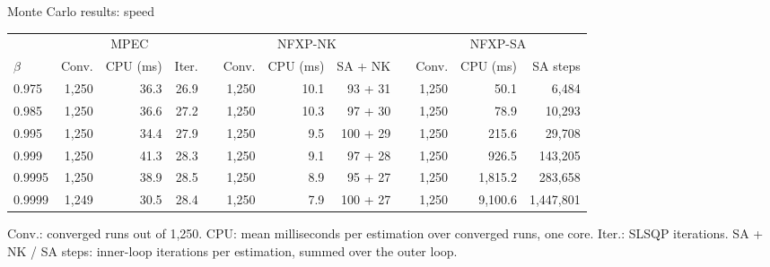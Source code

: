 \documentclass[aspectratio=169,11pt]{beamer}
\begin{document}
\begin{frame}{Monte Carlo results: speed}
\scriptsize
\begin{center}
\begin{tabular}{l rrr c rrr c rrr}
\toprule
 & \multicolumn{3}{c}{MPEC} & & \multicolumn{3}{c}{NFXP-NK} & & \multicolumn{3}{c}{NFXP-SA}\\
\cmidrule{2-4} \cmidrule{6-8} \cmidrule{10-12}
$\beta$ & Conv. & CPU (ms) & Iter. & & Conv. & CPU (ms) & SA + NK & & Conv. & CPU (ms) & SA steps\\
\midrule
0.975  & 1{,}250 & 36.3 & 26.9 & & 1{,}250 & 10.1 & 93 + 31  & & 1{,}250 & 50.1    & 6{,}484\\
0.985  & 1{,}250 & 36.6 & 27.2 & & 1{,}250 & 10.3 & 97 + 30  & & 1{,}250 & 78.9    & 10{,}293\\
0.995  & 1{,}250 & 34.4 & 27.9 & & 1{,}250 &  9.5 & 100 + 29 & & 1{,}250 & 215.6   & 29{,}708\\
0.999  & 1{,}250 & 41.3 & 28.3 & & 1{,}250 &  9.1 & 97 + 28  & & 1{,}250 & 926.5   & 143{,}205\\
0.9995 & 1{,}250 & 38.9 & 28.5 & & 1{,}250 &  8.9 & 95 + 27  & & 1{,}250 & 1{,}815.2 & 283{,}658\\
0.9999 & 1{,}249 & 30.5 & 28.4 & & 1{,}250 &  7.9 & 100 + 27 & & 1{,}250 & 9{,}100.6 & 1{,}447{,}801\\
\bottomrule
\end{tabular}
\end{center}
Conv.: converged runs out of 1{,}250. CPU: mean milliseconds per estimation over converged runs, one core. Iter.: SLSQP iterations. SA + NK / SA steps: inner-loop iterations per estimation, summed over the outer loop.
\end{frame}
\end{document}

